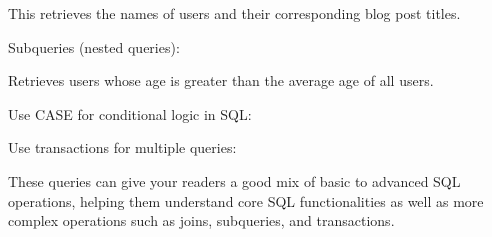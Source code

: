 This retrieves the names of users and their corresponding blog post titles.

Subqueries (nested queries):



Retrieves users whose age is greater than the average age of all users.

Use {CASE for conditional} logic in SQL:



Use transactions for multiple queries:



These queries can give your readers a good mix of basic to advanced SQL operations, 
helping them understand core SQL functionalities as well as more complex operations such as joins,
 subqueries, and transactions.
